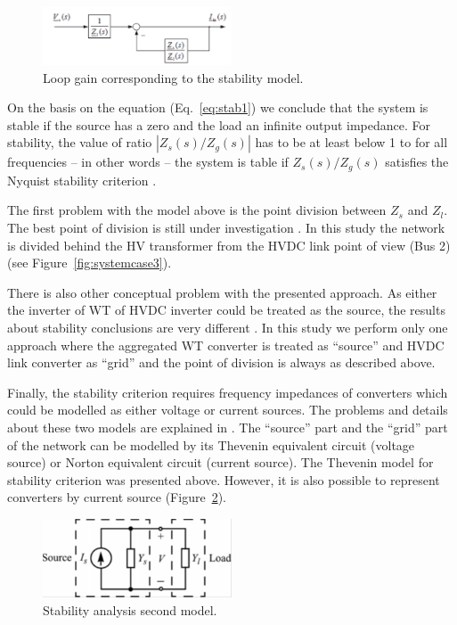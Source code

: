 \documentclass[12pt]{report} %
\begin{document}
\begin{figure}[htb]
	\centering
    	\includegraphics[width=0.5\textwidth]{img/theory/stability_loop.png}
  	\caption{Loop gain corresponding to the stability model.}
  	\label{fig:stabilityloop}
\end{figure}
\FloatBarrier

On the basis on the equation (Eq.~\ref{eq:stab1}) we conclude that the system is stable if the source has a zero and the load an infinite output impedance. For stability, the value of ratio $|Z_s (s)/Z_g (s)|$ has to be at least below 1 to for all frequencies \cite{sun2011} – in other words – the system is table if  $Z_s (s)/Z_g (s)$ satisfies the Nyquist stability criterion \cite{middlebrook1976}.

The first problem with the model above is the point division between $Z_s$ and $Z_l$. The best point of division is still under investigation \cite{borwin1}. In this study the network is divided behind the HV transformer from the HVDC link point of view (Bus 2) (see Figure~\ref{fig:systemcase3}).

There is also other conceptual problem with the presented approach. As either the inverter of WT of HVDC inverter could be treated as the source, the results about stability conclusions are very different \cite{sun2011}. In this study we perform only one approach where the aggregated WT converter is treated as “source” and HVDC link converter as “grid” and the point of division is always as described above.

Finally, the stability criterion requires frequency impedances of converters which could be modelled as either voltage or current sources. The problems and details about these two models are explained in \cite{sun2011}. The “source” part and the “grid” part of the network can be modelled by its Thevenin equivalent circuit (voltage source) or Norton equivalent circuit (current source). 
The Thevenin model for stability criterion was presented above. However, it is also possible to represent converters by current source \cite{sun2011} (Figure~\ref{fig:stabilitymodel2}).

\begin{figure}[htb]
	\centering
    	\includegraphics[width=0.5\textwidth]{img/theory/stability_model2.png}
  	\caption{Stability analysis second model.}
  	\label{fig:stabilitymodel2}
\end{figure}
\FloatBarrier
\end{document}
